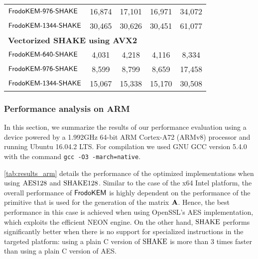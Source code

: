 \documentclass{iacrcc}
\newif\ifshoworiginal
\begin{document}
\begin{table}[t]
\begin{tabular}{l|c c c|c}
$\textsf{\upshape\mdseries FrodoKEM-976-SHAKE}$          &          16,874                  &          17,101                  &               16,971           &              34,072        \\
$\textsf{\upshape\mdseries FrodoKEM-1344-SHAKE}$          &          30,465                  &          30,626                  &               30,451             &              61,077        \\
\midrule
\multicolumn{5}{l}{\bf Vectorized SHAKE using AVX2} \\
\midrule
$\textsf{\upshape\mdseries FrodoKEM-640-SHAKE}$            &           4,031                  &           4,218                  &                4,116             &               8,334        \\
$\textsf{\upshape\mdseries FrodoKEM-976-SHAKE}$          &           8,599                  &           8,799                  &                8,659             &              17,458        \\
$\textsf{\upshape\mdseries FrodoKEM-1344-SHAKE}$          &          15,067                  &          15,338                  &               15,170             &              30,508        \\
\bottomrule
\end{tabular}
\end{table}


\subsubsection{Performance analysis on ARM}\label{sec:results_arm}

\ifshoworiginal
In this section, we summarize the results of our performance evaluation using a device powered by a 1.992GHz 64-bit ARM Cortex-A72 (ARMv8) processor and running Ubuntu 16.04.2 LTS. For compilation we used GNU GCC version 5.4.0 with the command {\tt gcc -O3 -march=native}. 

\autoref{tab:results_arm} details the performance of the optimized implementations when using $\textrm{\upshape\mdseries AES128}$ and $\textrm{\upshape\mdseries SHAKE}128$. Similar to the case of the x64 Intel platform, the overall performance of $\textsf{\upshape\mdseries FrodoKEM}$ is highly dependent on the performance of the primitive that is used for the generation of the matrix $\mathbf{A}$. Hence, the best performance in this case is achieved when using OpenSSL's AES implementation, which exploits the efficient NEON engine. On the other hand, $\textrm{\upshape\mdseries SHAKE}$ performs significantly better when there is no support for specialized instructions in the targeted platform: using a plain C version of $\textrm{\upshape\mdseries SHAKE}$ is more than 3 times faster than using a plain C version of AES.
\end{document}
